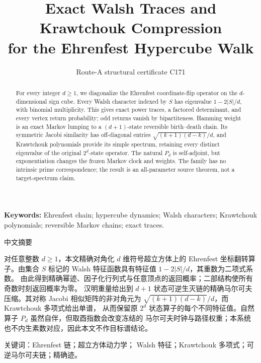 \documentclass[10pt]{article}
\title{\vspace{-1.8em}Exact Walsh Traces and Krawtchouk Compression\\for the Ehrenfest Hypercube Walk}
\author{Route-A structural certificate C171}
\date{}
\begin{document}
\maketitle
\begin{abstract}
For every integer $d\geq1$, we diagonalize the Ehrenfest coordinate-flip
operator on the $d$-dimensional sign cube.  Every Walsh character indexed by
$S$ has eigenvalue $1-2|S|/d$, with binomial multiplicity.  This gives exact
power traces, a factored determinant, and every vertex return probability;
odd returns vanish by bipartiteness.  Hamming weight is an exact Markov
lumping to a $(d+1)$-state reversible birth--death chain.  Its symmetric
Jacobi similarity has off-diagonal entries
$\sqrt{(k+1)(d-k)}/d$, and Krawtchouk polynomials provide its simple spectrum,
retaining every distinct eigenvalue of the original $2^d$-state operator.
The natural $P_d$ is self-adjoint, but exponentiation changes the frozen
Markov clock and weights.  The family has no intrinsic prime correspondence;
the result is an all-parameter source theorem, not a target-spectrum claim.
\end{abstract}
\noindent\textbf{Keywords:} Ehrenfest chain; hypercube dynamics; Walsh
characters; Krawtchouk polynomials; reversible Markov chains; exact traces.

\begin{otherlanguage}{chinese-simplified}
\begin{center}{\large 中文摘要}\end{center}
\begin{sloppypar}
对任意整数 $d\geq1$，本文精确对角化 $d$ 维符号超立方体上的
\foreignlanguage{english}{Ehrenfest} 坐标翻转算子。由集合 $S$ 标记的
\foreignlanguage{english}{Walsh} 特征函数具有特征值 $1-2|S|/d$，其重数为二项式系数。
由此得到精确幂迹、因子化行列式与任意顶点的返回概率；二部结构使所有奇数时刻返回概率为零。
汉明重量给出到 $d+1$ 状态可逆生灭链的精确马尔可夫压缩。其对称
\foreignlanguage{english}{Jacobi} 相似矩阵的非对角元为
$\sqrt{(k+1)(d-k)}/d$，而 \foreignlanguage{english}{Krawtchouk} 多项式给出单谱，
从而保留原 $2^d$ 状态算子的每个不同特征值。自然算子 $P_d$ 虽然自伴，但取酉指数会改变冻结的
马尔可夫时钟与路径权重；本系统也不内生素数对应，因此本文不作目标谱结论。
\end{sloppypar}
\noindent 关键词：\foreignlanguage{english}{Ehrenfest} 链；超立方体动力学；
\foreignlanguage{english}{Walsh} 特征；\foreignlanguage{english}{Krawtchouk} 多项式；可逆马尔可夫链；精确迹。
\end{otherlanguage}
\end{document}

